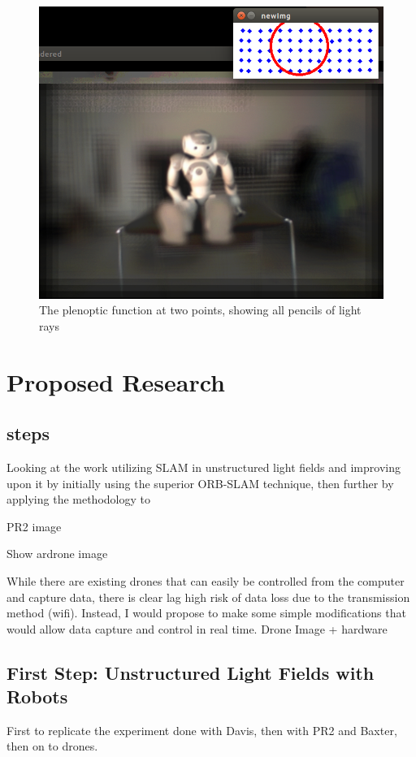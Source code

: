 \documentclass[12pt]{report}
\begin{document}
\begin{figure}[!ht]
	\centering
	\includegraphics[scale=0.4]{nau_lf.png}
	\caption{The plenoptic function at two points, showing all pencils of light rays \cite{Adelson91}}
	\label{fig:parameterization_visual}
\end{figure}

\chapter*{Proposed Research}
\section*{steps}
Looking at the work utilizing SLAM in unstructured light fields and improving upon it by initially using the superior ORB-SLAM technique, then further by applying the methodology to 

PR2 image

Show ardrone image

While there are existing drones that can easily be controlled from the computer and capture data, there is clear lag high risk of data loss due to the transmission method (wifi). Instead, I would propose to make some simple modifications that would allow data capture and control in real time.
Drone Image + hardware

\section{First Step: Unstructured Light Fields with Robots}
First to replicate the experiment done with Davis, then with PR2 and Baxter, then on to drones.
\end{document}
